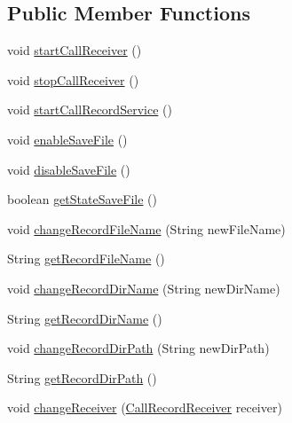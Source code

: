 \subsection*{Public Member Functions}
\begin{DoxyCompactItemize}
\item 
void \hyperlink{classcom_1_1aykuttasil_1_1callrecord_1_1_call_record_ab7603981df60fd6c66fdc8692ca08ee6}{start\+Call\+Receiver} ()
\item 
void \hyperlink{classcom_1_1aykuttasil_1_1callrecord_1_1_call_record_a269eed369eac397c04aca3176c0715f7}{stop\+Call\+Receiver} ()
\item 
void \hyperlink{classcom_1_1aykuttasil_1_1callrecord_1_1_call_record_a1d82c1d77cf1bec400c1e281b8730075}{start\+Call\+Record\+Service} ()
\item 
void \hyperlink{classcom_1_1aykuttasil_1_1callrecord_1_1_call_record_a8ffc1079f79fcfc9ef2ef2c17f030173}{enable\+Save\+File} ()
\item 
void \hyperlink{classcom_1_1aykuttasil_1_1callrecord_1_1_call_record_ae1bb1b4b4b0dd8012a4443d8c7ea5319}{disable\+Save\+File} ()
\item 
boolean \hyperlink{classcom_1_1aykuttasil_1_1callrecord_1_1_call_record_a3fe28aee7367f67e6d34a11dcdd10673}{get\+State\+Save\+File} ()
\item 
void \hyperlink{classcom_1_1aykuttasil_1_1callrecord_1_1_call_record_a46f071e0d6c3d9f2fd87cce016b74aad}{change\+Record\+File\+Name} (String new\+File\+Name)
\item 
String \hyperlink{classcom_1_1aykuttasil_1_1callrecord_1_1_call_record_a05ca6a80ce9f6477b5ab6c8475eb6867}{get\+Record\+File\+Name} ()
\item 
void \hyperlink{classcom_1_1aykuttasil_1_1callrecord_1_1_call_record_a4d821dd8af3aecba6f2618f799099cb9}{change\+Record\+Dir\+Name} (String new\+Dir\+Name)
\item 
String \hyperlink{classcom_1_1aykuttasil_1_1callrecord_1_1_call_record_a9a68d111ed8cf646ac90fe8cb32ffacb}{get\+Record\+Dir\+Name} ()
\item 
void \hyperlink{classcom_1_1aykuttasil_1_1callrecord_1_1_call_record_a431bf7816cd1f9a635f2eaf7dc9514f2}{change\+Record\+Dir\+Path} (String new\+Dir\+Path)
\item 
String \hyperlink{classcom_1_1aykuttasil_1_1callrecord_1_1_call_record_a71b3661c65db0f8c87522aa85a1d6f7c}{get\+Record\+Dir\+Path} ()
\item 
void \hyperlink{classcom_1_1aykuttasil_1_1callrecord_1_1_call_record_a0b6b62b01721308ebcdbaf3c078aa2fa}{change\+Receiver} (\hyperlink{classcom_1_1aykuttasil_1_1callrecord_1_1receiver_1_1_call_record_receiver}{Call\+Record\+Receiver} receiver)
\end{DoxyCompactItemize}
